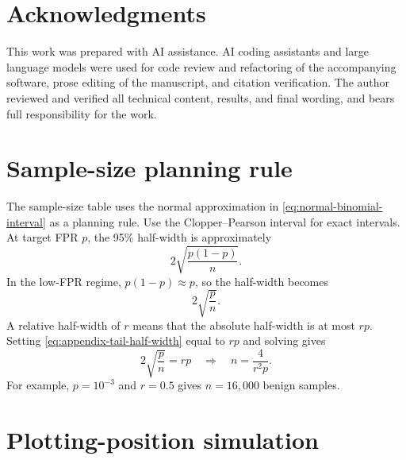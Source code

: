 \documentclass{article}
\begin{document}
\section*{Acknowledgments}
\label{sec:acknowledgments}

This work was prepared with AI assistance.
AI coding assistants and large language models were used for code review and refactoring of the accompanying software, prose editing of the manuscript, and citation verification.
The author reviewed and verified all technical content, results, and final wording, and bears full responsibility for the work.




\appendix
{}

\section{Sample-size planning rule}
\label{sec:sample-size-rule-derivation}

The sample-size table uses the normal approximation in \cref{eq:normal-binomial-interval} as a planning rule.
Use the Clopper--Pearson interval \citep{clopper1934} for exact intervals.
At target FPR $p$, the 95\% half-width is approximately
\begin{equation}
\label{eq:appendix-absolute-half-width}
2\sqrt{\frac{p(1-p)}{n}}.
\end{equation}
In the low-FPR regime, $p(1-p)\approx p$, so the half-width becomes
\begin{equation}
\label{eq:appendix-tail-half-width}
2\sqrt{\frac{p}{n}}.
\end{equation}
A relative half-width of $r$ means that the absolute half-width is at most $rp$.
Setting \cref{eq:appendix-tail-half-width} equal to $rp$ and solving gives
\begin{equation}
\label{eq:appendix-sample-size-solve}
2\sqrt{\frac{p}{n}}=rp
\quad\Longrightarrow\quad
n=\frac{4}{r^2p}.
\end{equation}
For example, $p=10^{-3}$ and $r=0.5$ gives $n=16{,}000$ benign samples.

\section{Plotting-position simulation}
\label{sec:plotting-position-simulation}
\end{document}

